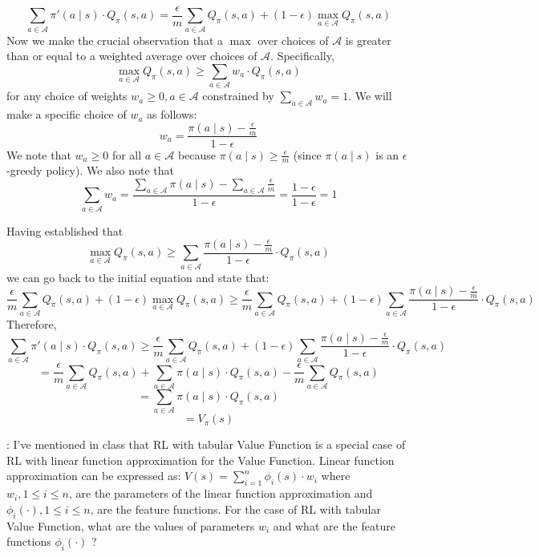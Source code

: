 \documentclass[12pt]{exam}
\begin{document}
\begin{questions}
$$\sum_{a \in \mathcal{A}} \pi'(a \mid s) \cdot Q_{\pi}(s,a) = \frac \epsilon  m \sum_{a \in \mathcal{A}} Q_{\pi}(s,a) + (1 - \epsilon) \max_{a \in \mathcal{A}} Q_{\pi}(s,a)$$
Now we make the crucial observation that a $\max$ over choices of $\mathcal{A}$ is greater than or equal to a weighted average over choices of $\mathcal{A}$. Specifically,
$$\max_{a \in \mathcal{A}} Q_{\pi}(s,a) \geq \sum_{a \in \mathcal{A}} w_a \cdot Q_{\pi}(s,a)$$
for any choice of weights $w_a \geq 0, a \in \mathcal{A}$ constrained by $\sum_{a \in \mathcal{A}} w_a = 1$.
We will make a specific choice of $w_a$ as follows:
$$w_a = \frac {\pi(a \mid s)  - \frac \epsilon m} {1 - \epsilon}$$
We note that $w_a \geq 0$ for all $a \in \mathcal{A}$ because $\pi(a \mid s) \geq \frac \epsilon m$ (since $\pi(a \mid s)$ is an $\epsilon$-greedy policy). We also note that $$\sum_{a \in \mathcal{A}} w_a = \frac {\sum_{a \in \mathcal{A}} \pi(a \mid s) - \sum_{a \in \mathcal{A}} \frac \epsilon m} {1 - \epsilon} = \frac {1 - \epsilon} {1 - \epsilon} = 1$$

Having established that
$$\max_{a \in \mathcal{A}} Q_{\pi}(s,a) \geq \sum_{a \in \mathcal{A}} \frac {\pi(a \mid s)  - \frac \epsilon m} {1 - \epsilon} \cdot Q_{\pi}(s,a)$$
we can go back to the initial equation and state that:
$$\frac \epsilon  m \sum_{a \in \mathcal{A}} Q_{\pi}(s,a) + (1 - \epsilon) \max_{a \in \mathcal{A}} Q_{\pi}(s,a) \geq \frac \epsilon  m \sum_{a \in \mathcal{A}} Q_{\pi}(s,a) + (1 - \epsilon) \sum_{a \in \mathcal{A}} \frac {\pi(a \mid s)  - \frac \epsilon m} {1 - \epsilon} \cdot Q_{\pi}(s,a)$$
Therefore,
$$\sum_{a \in \mathcal{A}} \pi'(a \mid s) \cdot Q_{\pi}(s,a) \geq \frac \epsilon  m \sum_{a \in \mathcal{A}} Q_{\pi}(s,a) + (1 - \epsilon) \sum_{a \in \mathcal{A}} \frac {\pi(a \mid s)  - \frac \epsilon m} {1 - \epsilon} \cdot Q_{\pi}(s,a)$$
$$ = \frac \epsilon  m \sum_{a \in \mathcal{A}} Q_{\pi}(s,a) + \sum_{a \in \mathcal{A}} \pi(a \mid s) \cdot Q_{\pi}(s,a)  - \frac \epsilon m  \sum_{a \in \mathcal{A}} Q_{\pi}(s,a)$$
$$ = \sum_{a \in \mathcal{A}} \pi(a \mid s) \cdot Q_{\pi}(s,a)$$
$$ = V_{\pi}(s)$$

\vspace{15mm}

: I've mentioned in class that RL with tabular Value Function is a special case of RL with linear function approximation for the Value Function. Linear function approximation can be expressed as: $V(s) = \sum_{i=1}^n \phi_i(s) \cdot w_i$ where $w_i, 1\leq i \leq n$, are the parameters of the linear function approximation and $\phi_i(\cdot), 1 \leq i \leq n$, are the feature functions. For the case of RL with tabular Value Function, what are the values of parameters $w_i$ and what are the feature functions $\phi_i(\cdot)$ ?


\end{questions}
\end{document}
